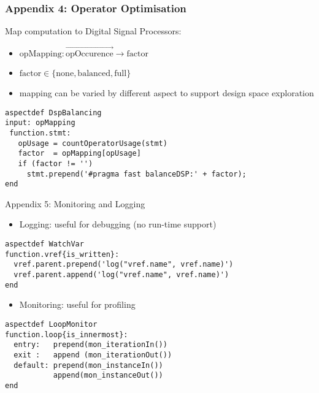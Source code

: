 \begin{frame}[fragile]
  \frametitle{Appendix 4: Operator Optimisation}
  Map computation to Digital Signal Processors:
  \begin{itemize}
  \item $ \text{opMapping} : \overrightarrow{\text{opOccurence}} \rightarrow \text{factor}$
  \item $\text{factor} \in \{\text{none}, \text{balanced}, \text{full}\} $
  \item mapping can be varied by different aspect to support design
    space exploration
  \end{itemize}
  \begin{lstlisting}[label=lst:label, style=lara]
aspectdef DspBalancing
input: opMapping
 function.stmt:
   opUsage = countOperatorUsage(stmt)
   factor  = opMapping[opUsage]
   if (factor != '')
     stmt.prepend('#pragma fast balanceDSP:' + factor);
end
  \end{lstlisting}
\end{frame}

\begin{frame}[fragile]{Appendix 5: Monitoring and Logging}
  \begin{itemize}
  \item Logging: useful for debugging (no run-time support)
  \end{itemize}
  \begin{lstlisting}[label=lst:label, style=lara]
aspectdef WatchVar
function.vref{is_written}:
  vref.parent.prepend('log("vref.name", vref.name)')
  vref.parent.append('log("vref.name", vref.name)')
end
  \end{lstlisting}

  \begin{itemize}
  \item Monitoring: useful for profiling
  \end{itemize}
  \begin{lstlisting}[label=lst:label, style=lara]
aspectdef LoopMonitor
function.loop{is_innermost}:
  entry:   prepend(mon_iterationIn())
  exit :   append (mon_iterationOut())
  default: prepend(mon_instanceIn())
           append(mon_instanceOut())
end
  \end{lstlisting}
\end{frame}
